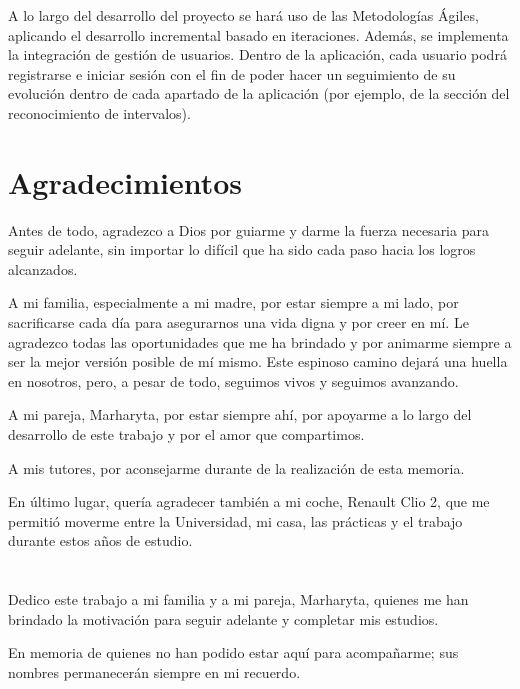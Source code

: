 \par A lo largo del desarrollo del proyecto se hará uso de las Metodologías Ágiles, aplicando el desarrollo incremental basado en iteraciones.
Además, se implementa la integración de gestión de usuarios. Dentro de la aplicación, cada usuario podrá registrarse e iniciar sesión con el fin de poder hacer un seguimiento de su evolución dentro de cada apartado de la aplicación (por ejemplo, de la sección del reconocimiento de intervalos).

\cleardoublepage %
\chapter{Agradecimientos}

\thispagestyle{empty}
\vspace{1cm}
Antes de todo, agradezco a Dios por guiarme y darme la fuerza necesaria para seguir adelante, sin importar lo difícil que ha sido cada paso hacia los logros alcanzados.
\par A mi familia, especialmente a mi madre, por estar siempre a mi lado, por sacrificarse cada día para asegurarnos una vida digna y por creer en mí. Le agradezco todas las oportunidades que me ha brindado y por animarme siempre a ser la mejor versión posible de mí mismo. Este espinoso camino dejará una huella en nosotros, pero, a pesar de todo, seguimos vivos y seguimos avanzando.
\par A mi pareja, Marharyta, por estar siempre ahí, por apoyarme a lo largo del desarrollo de este trabajo y por el amor que compartimos.
\par A mis tutores, por aconsejarme durante de la realización de esta memoria.
\par En último lugar, quería agradecer también a mi coche, Renault Clio 2, que me permitió moverme entre la Universidad, mi casa, las prácticas y el trabajo durante estos años de estudio.

\cleardoublepage %
\chapter*{}
\setlength{\leftmargin}{0.5\textwidth}
\setlength{\parsep}{0cm}
\addtolength{\topsep}{0.5cm}

\begin{flushright}
\small\em{
\par Dedico este trabajo a mi familia y a mi pareja, Marharyta, quienes me han brindado la motivación para seguir adelante y completar mis estudios.
\vspace{1cm}
\par En memoria de quienes no han podido estar aquí para acompañarme; sus nombres permanecerán siempre en mi recuerdo.
}
\end{flushright}

